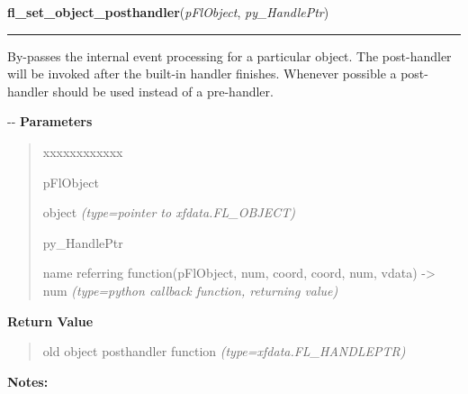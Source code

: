     \label{xformslib:flbasic:fl_set_object_posthandler}

    \vspace{0.5ex}

\hspace{.8\funcindent}\begin{boxedminipage}{\funcwidth}

    \raggedright \textbf{fl\_set\_object\_posthandler}(\textit{pFlObject}, \textit{py\_HandlePtr})

    \vspace{-1.5ex}

    \rule{\textwidth}{0.5\fboxrule}
\setlength{\parskip}{2ex}

By-passes the internal event processing for a particular object. The
post-handler will be invoked after the built-in handler finishes. Whenever
possible a post-handler should be used instead of a pre-handler.

-{}-
\setlength{\parskip}{1ex}
      \textbf{Parameters}
      \vspace{-1ex}

      \begin{quote}
        \begin{Ventry}{xxxxxxxxxxxx}

          \item[pFlObject]


object
            {\it (type=pointer to xfdata.FL\_OBJECT)}

          \item[py\_HandlePtr]


name referring function(pFlObject, num, coord, coord, num,
vdata) -> num
            {\it (type=python callback function, returning value)}

        \end{Ventry}

      \end{quote}

      \textbf{Return Value}
    \vspace{-1ex}

      \begin{quote}

old object posthandler function
      {\it (type=xfdata.FL\_HANDLEPTR)}

      \end{quote}

\textbf{Notes:}
\begin{quote}
  \begin{itemize}


\end{itemize}
\end{quote}
\end{boxedminipage}
